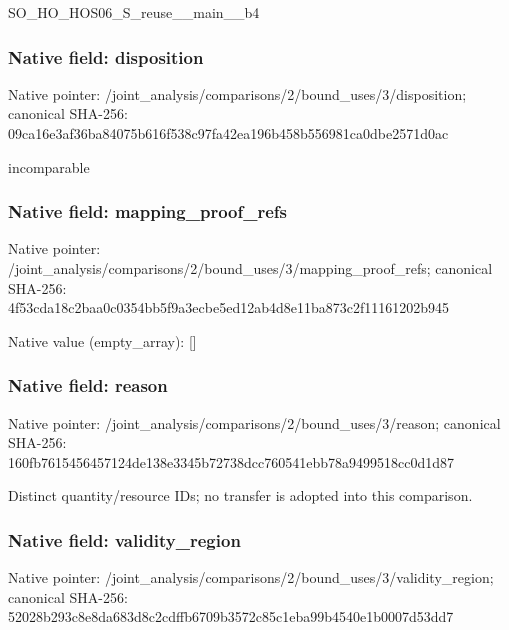 \documentclass[10pt,a4paper]{article}
\begin{document}
\begingroup\raggedright\sloppy SO\_\allowbreak{}HO\_\allowbreak{}HOS06\_\allowbreak{}S\_\allowbreak{}reuse\_\allowbreak{}\_\allowbreak{}main\_\allowbreak{}\_\allowbreak{}b4\par\endgroup

\subsubsection{Native field: disposition}
Native pointer: /joint\_\allowbreak{}analysis/comparisons/2/bound\_\allowbreak{}uses/3/disposition; canonical SHA-256: 09ca16e3af36ba84075b616f538c97fa42ea196b458b556981ca0dbe2571d0ac

\begingroup\raggedright\sloppy incomparable\par\endgroup

\subsubsection{Native field: mapping\_\allowbreak{}proof\_\allowbreak{}refs}
Native pointer: /joint\_\allowbreak{}analysis/comparisons/2/bound\_\allowbreak{}uses/3/mapping\_\allowbreak{}proof\_\allowbreak{}refs; canonical SHA-256: 4f53cda18c2baa0c0354bb5f9a3ecbe5ed12ab4d8e11ba873c2f11161202b945

Native value (empty\_\allowbreak{}array): []

\subsubsection{Native field: reason}
Native pointer: /joint\_\allowbreak{}analysis/comparisons/2/bound\_\allowbreak{}uses/3/reason; canonical SHA-256: 160fb7615456457124de138e3345b72738dcc760541ebb78a9499518cc0d1d87

\begingroup\raggedright\sloppy Distinct quantity/\allowbreak{}resource IDs;\allowbreak{} no transfer is adopted into this comparison.\par\endgroup

\subsubsection{Native field: validity\_\allowbreak{}region}
Native pointer: /joint\_\allowbreak{}analysis/comparisons/2/bound\_\allowbreak{}uses/3/validity\_\allowbreak{}region; canonical SHA-256: 52028b293c8e8da683d8c2cdffb6709b3572c85c1eba99b4540e1b0007d53dd7
\end{document}
